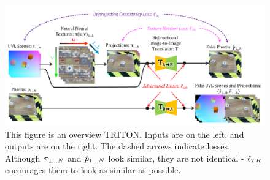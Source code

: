 \documentclass{article}
\begin{document}
\begin{figure}[H]
	\begin{center}
		\includegraphics[width=400pt]{../images/main_diagram_beautiful.pdf}
	\end{center}
	\caption{
		This figure is an overview TRITON.
		Inputs are on the left, and outputs are on the right.
		The dashed arrows indicate losses.
		Although $\pi_{1\dots N}$ and $\hat{p}_{1\dots N}$ look similar, they are not identical - $\ell_{TR}$ encourages them to look as similar as possible.
	}
	\label{fig:main_diagram}
\end{figure}
\end{document}

